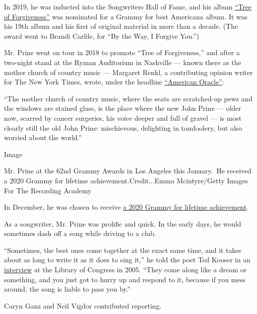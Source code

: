In 2019, he was inducted into the Songwriters Hall of Fame, and his
album
\href{https://www.youtube.com/watch?v=aAYoWePzQ2c\&list=OLAK5uy_mYUVcJHLfobY-NDHtulgiqGaq_vkwc1z4}{``Tree
of Forgiveness''} was nominated for a Grammy for best Americana album.
It was his 19th album and his first of original material in more than a
decade. (The award went to Brandi Carlile, for ``By the Way, I Forgive
You.'')

Mr. Prine went on tour in 2018 to promote ``Tree of Forgiveness,'' and
after a two-night stand at the Ryman Auditorium in Nashville --- known
there as the mother church of country music --- Margaret Renkl, a
contributing opinion writer for The New York Times, wrote, under the
headline
\href{https://www.nytimes.com/2018/10/22/opinion/john-prine-american-oracle.html}{``American
Oracle''}:

``The mother church of country music, where the seats are scratched-up
pews and the windows are stained glass, is the place where the new John
Prine --- older now, scarred by cancer surgeries, his voice deeper and
full of gravel --- is most clearly still the old John Prine:
mischievous, delighting in tomfoolery, but also worried about the
world.''

Image

Mr. Prine at the 62nd Grammy Awards in Los Angeles this January.~He
received a 2020 Grammy for lifetime achievement.Credit...Emma
Mcintyre/Getty Images For The Recording Academy

In December, he was chosen to receive
\href{https://www.rollingstone.com/music/music-country/john-prine-grammy-lifetime-achievement-929523/}{a
2020 Grammy for lifetime achievement}.

As a songwriter, Mr. Prine was prolific and quick. In the early days, he
would sometimes dash off a song while driving to a club.

``Sometimes, the best ones come together at the exact same time, and it
takes about as long to write it as it does to sing it,'' he told the
poet Ted Kooser in an
\href{http://www.loc.gov/today/cyberlc/feature_wdesc.php?rec=3677}{interview}
at the Library of Congress in 2005. ``They come along like a dream or
something, and you just got to hurry up and respond to it, because if
you mess around, the song is liable to pass you by.''

Caryn Ganz and Neil Vigdor contributed reporting.

\href{https://www.nytimes.com/interactive/2020/obituaries/people-died-coronavirus-obituaries.html?action=click\&pgtype=Article\&state=default\&region=BELOW_MAIN_CONTENT\&context=covid_obits_promo}{}

